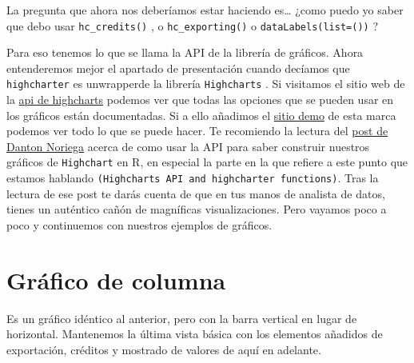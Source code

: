 \documentclass[
]{book}
\newenvironment{Shaded}{\begin{snugshade}}{\end{snugshade}}
\newcommand{\AttributeTok}[1]{\textcolor[rgb]{0.77,0.63,0.00}{#1}}
\newcommand{\ConstantTok}[1]{\textcolor[rgb]{0.00,0.00,0.00}{#1}}
\newcommand{\FunctionTok}[1]{\textcolor[rgb]{0.00,0.00,0.00}{#1}}
\newcommand{\NormalTok}[1]{#1}
\newcommand{\SpecialCharTok}[1]{\textcolor[rgb]{0.00,0.00,0.00}{#1}}
\newcommand{\StringTok}[1]{\textcolor[rgb]{0.31,0.60,0.02}{#1}}
\begin{document}
La pregunta que ahora nos deberíamos estar haciendo es\ldots{} ¿como puedo yo saber que debo usar \texttt{hc\_credits()} , o \texttt{hc\_exporting()} o \texttt{dataLabels(list=())} ?

Para eso tenemos lo que se llama la API de la librería de gráficos. Ahora entenderemos mejor el apartado de presentación cuando decíamos que \texttt{highcharter} es unwrapperde la librería \texttt{Highcharts} . Si visitamos el sitio web de la \href{https://api.highcharts.com}{api de highcharts} podemos ver que todas las opciones que se pueden usar en los gráficos están documentadas. Si a ello añadimos el \href{https://highcharts.com/demo}{sitio demo} de esta marca podemos ver todo lo que se puede hacer. Te recomiendo la lectura del \href{https://dantonnoriega.github.io/ultinomics.org/posts/2017-04-05-highcharter-explainer.html}{post de Danton Noriega} acerca de como usar la API para saber construir nuestros gráficos de \texttt{Highchart} en R, en especial la parte en la que refiere a este punto que estamos hablando \texttt{(Highcharts\ API\ and\ highcharter\ functions)}. Tras la lectura de ese post te darás cuenta de que en tus manos de analista de datos, tienes un auténtico cañón de magníficas visualizaciones. Pero vayamos poco a poco y continuemos con nuestros ejemplos de gráficos.

\hypertarget{gruxe1fico-de-columna}{%
\section{Gráfico de columna}\label{gruxe1fico-de-columna}}

Es un gráfico idéntico al anterior, pero con la barra vertical en lugar de horizontal. Mantenemos la última vista básica con los elementos añadidos de exportación, créditos y mostrado de valores de aquí en adelante.

\begin{Shaded}
\end{Shaded}
\end{document}
